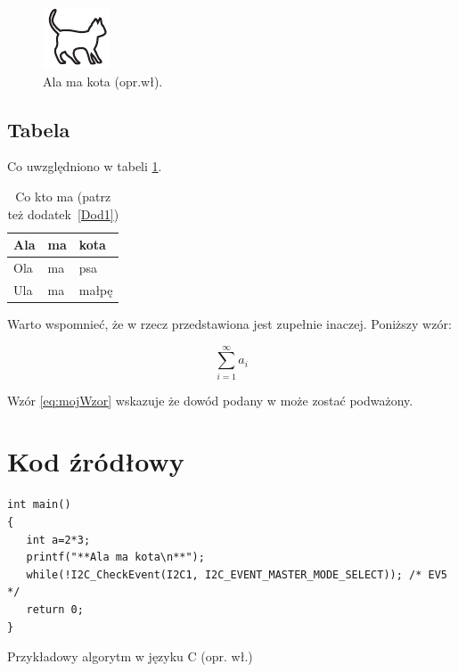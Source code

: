 \begin{figure}[h!]
\centering\includegraphics[width=.4\textwidth]{img/kotek}
\caption{Ala ma kota (opr.wł).}\label{rysunek:kot}
\end{figure}

\subsection{Tabela}

Co uwzględniono w tabeli \ref{tabela:coktoma}. \lipsum[13-15] 

\begin{table}[h!]
\centering\caption{Co kto ma \cite{harel_rzecz_2008} (patrz też dodatek~\ref{Dod1}) \label{tabela:coktoma}}
\begin{tabular}{|l|l|l|}%
\hline
Ala & ma & kota \\
\hline
Ola & ma & psa \\
\hline
Ula & ma & małpę\\
\hline
\end{tabular}
\end{table}

\lipsum[19-20] Warto wspomnieć, że w \cite{aizawa_groundwater_2009} rzecz przedstawiona jest zupełnie inaczej. Poniższy wzór:

\begin{equation}
\sum_{i=1}^{\infty}a_i
\label{eq:mojWzor}
\end{equation}

Wzór \ref{eq:mojWzor} wskazuje że dowód podany w \cite{kaleta_experimental_2005} może zostać podważony. \lipsum[9]

\section{Kod źródłowy}

\begin{listing}[h!]
\begin{verbatim} 
int main()
{
   int a=2*3;
   printf("**Ala ma kota\n**");
   while(!I2C_CheckEvent(I2C1, I2C_EVENT_MASTER_MODE_SELECT)); /* EV5 */
   return 0;
}
\end{verbatim}
\caption{Przykładowy algorytm w języku C (opr. wł.)} \label{listing:moj}
\end{listing}

